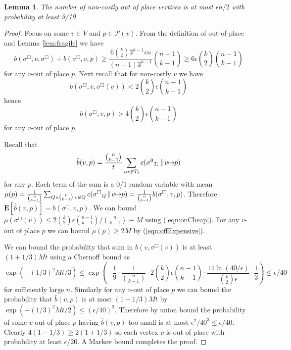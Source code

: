 \documentclass[dvips,11pt,letter]{article}
\newcommand{\E}[1]{\mathbf{E}\left[#1\right]}
\newtheorem{lemma}[theorem]{Lemma}
\newcommand{\unaryOrdering}{\!\!\mapsto\!\!}
\newcommand{\posns}{\mathcal{P}}
\newcommand{\bp}{\,\,\rule[-0.22em]{0.08em}{1em}\,\,} \newcommand{\restrictO}[2]{{#1}_{#2}}
\newcommand{\roundOpt}{\sigma^{\Box}}
\newcommand{\costlyB}{2 \binom{k}{2} \epsilon \binom{n-1}{k-1}}
\begin{document}
\begin{lemma}\label{lem:random}
The number of non-costly out of place vertices is at most $\epsilon n / 2$ with probability at least 9/10.
\end{lemma}

\begin{proof}Focus on some $v \in V$ and $p \in \posns(v)$. From the definition of out-of-place and Lemma \ref{lem:fragile} we have
\[
b(\roundOpt, v, \roundOpt) + b(\roundOpt, v, p) \ge \frac{6 \binom{k}{2} 3^{k-1} \epsilon n}{(n-1)3^{k-1}}\binom{n-1}{k-1} \ge 6 \epsilon \binom{k}{2} \binom{n-1}{k-1}
\]
for any $v$-out of place $p$. Next recall that for non-costly $v$ we have
\begin{equation}
b(\roundOpt, v, \roundOpt(v)) < \costlyB \label{eqn:onCheap}
\end{equation}
hence 
\begin{equation}
b(\roundOpt, v, p) > 4 \binom{k}{2} \epsilon \binom{n-1}{k-1} \label{eqn:offExpensive}
\end{equation}
for any $v$-out of place $p$.

Recall that
\[
\hat b(v,p) = \frac{\binom{n}{k-1}}{t} \sum_{i : v \not\in T_i} c(\restrictO{\sigma^0}{T_i} \bp v \unaryOrdering p)
\]
for any $p$. Each term of the sum is a 0/1 random variable with mean $\mu(p)=\frac{1}{\binom{n}{k-1}} \sum_{Q \in \binom{V}{k-1} : v \not \in Q} c(\restrictO{\sigma^\Box}{Q} \bp v \unaryOrdering p) = \frac{1}{\binom{n}{k-1}} b(\sigma^\Box, v, p)$. Therefore $\E{\hat b(v,p)} = b(\sigma^\Box, v,p)$. We can bound $\mu(\roundOpt(v)) \le \costlyB / \binom{n}{k-1} \equiv M$ using (\ref{eqn:onCheap}). For any $v$-out of place $p$ we can bound $\mu(p) \ge 2M$ by (\ref{eqn:offExpensive}).

We can bound the probability that sum in $\hat b(v,\roundOpt(v))$ is at least $(1+1/3)Mt$ using a Chernoff bound as 
\[
\exp(-(1/3)^2 M t / 3) \le \exp\left(- \frac{1}{9} \cdot \frac{1}{\binom{n}{k-1}} \cdot 2 \binom{k}{2} \epsilon \binom{n-1}{k-1} \cdot \frac{14 \ln (40/\epsilon)}{\binom{k}{2} \epsilon} \cdot \frac{1}{3}\right) \le \epsilon / 40
\]
for sufficiently large $n$. Similarly for any $v$-out of place $p$ we can bound the probability that $\hat b(v,p)$ is at most $(1-1/3)Mt$ by $\exp(-(1/3)^2 M t / 2) \le (\epsilon / 40)^3$.  Therefore by union bound the probability of some $v$-out of place $p$ having $\hat b(v,p)$ too small is at most $\epsilon^2 / 40^3 \le \epsilon / 40$. Clearly $4(1-1/3) \ge 2(1+1/3)$ so each vertex $v$ is out of place with probability at least $\epsilon /20$. A Markov bound completes the proof.
\end{proof}
\end{document}
